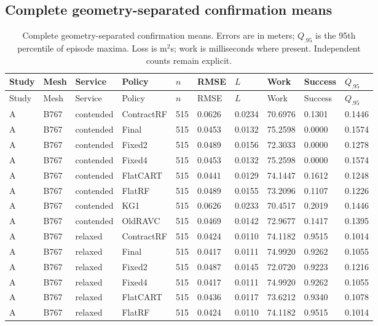\subsection{Complete geometry-separated confirmation means}
\scriptsize\setlength{\tabcolsep}{3pt}\begin{longtable}{@{}llllllllll@{}}
\caption{Complete geometry-separated confirmation means. Errors are in meters; $Q_{.95}$ is the 95th percentile of episode maxima. Loss is m$^2$s; work is milliseconds where present. Independent counts remain explicit.}\\\toprule
Study & Mesh & Service & Policy & $n$ & RMSE & $L$ & Work & Success & $Q_{.95}$\\\midrule\endfirsthead
\toprule
Study & Mesh & Service & Policy & $n$ & RMSE & $L$ & Work & Success & $Q_{.95}$\\\midrule\endhead
A & B767 & contended & ContractRF & 515 & 0.0626 & 0.0234 & 70.6976 & 0.1301 & 0.1446\\
A & B767 & contended & Final & 515 & 0.0453 & 0.0132 & 75.2598 & 0.0000 & 0.1574\\
A & B767 & contended & Fixed2 & 515 & 0.0489 & 0.0156 & 72.3033 & 0.0000 & 0.1278\\
A & B767 & contended & Fixed4 & 515 & 0.0453 & 0.0132 & 75.2598 & 0.0000 & 0.1574\\
A & B767 & contended & FlatCART & 515 & 0.0441 & 0.0129 & 74.1447 & 0.1612 & 0.1248\\
A & B767 & contended & FlatRF & 515 & 0.0489 & 0.0155 & 73.2096 & 0.1107 & 0.1226\\
A & B767 & contended & KG1 & 515 & 0.0626 & 0.0233 & 70.4517 & 0.2019 & 0.1446\\
A & B767 & contended & OldRAVC & 515 & 0.0469 & 0.0142 & 72.9677 & 0.1417 & 0.1395\\
A & B767 & relaxed & ContractRF & 515 & 0.0424 & 0.0110 & 74.1182 & 0.9515 & 0.1014\\
A & B767 & relaxed & Final & 515 & 0.0417 & 0.0111 & 74.9920 & 0.9262 & 0.1055\\
A & B767 & relaxed & Fixed2 & 515 & 0.0487 & 0.0145 & 72.0720 & 0.9223 & 0.1216\\
A & B767 & relaxed & Fixed4 & 515 & 0.0417 & 0.0111 & 74.9920 & 0.9262 & 0.1055\\
A & B767 & relaxed & FlatCART & 515 & 0.0436 & 0.0117 & 73.6212 & 0.9340 & 0.1078\\
A & B767 & relaxed & FlatRF & 515 & 0.0424 & 0.0110 & 74.1182 & 0.9515 & 0.1014\\

\end{longtable}
